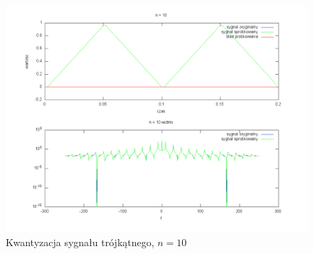 \documentclass[wide,a4paper,titlepage,12pt]{mwart}
\begin{document}
	\begin{landscape}
	  \begin{figure}[htbp]
	    \begin{center}
	      \includegraphics[scale=.5]{out/kwant3-10.png}
	      \caption{\label{kwant3-10} Kwantyzacja sygnału trójkątnego, $n=10$}
	    \end{center}
	  \end{figure}
	\end{landscape}
\end{document}
